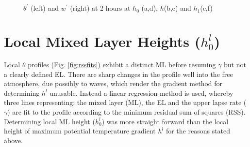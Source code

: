 \begin{figure}[htbp]
\caption{$\theta^{'}$ (left) and $w^{'}$ (right) at 2 hours at $h_{0}$ (a,d), $h$(b,e) and $h_{1}$(c,f)}
\begin{minipage}[b]{0.5\linewidth} 
        
        \\
        \\ 
 \end{minipage}             
\quad
\begin{minipage}[b]{0.5\linewidth}
        \\
       
       \\
        
\end{minipage}
        
        \label{fig:conts1}
\end{figure}

\clearpage


\section{Local Mixed Layer Heights ($h_{0}^{l}$)}
\label{sec:locmlh}     
\FloatBarrier

Local $\theta$ profiles (Fig. \ref{fig:rssfits}) exhibit a distinct \acs{ML} before resuming $\gamma$ but not 
a clearly defined \acs{EL}. There are sharp changes in the profile well into the free atmosphere, due possibly to 
waves, which render the gradient method for determining $h^{l}$ unusable.  Instead a linear regression method is used, 
whereby three lines representing: the mixed layer (ML), the EL and the upper lapse rate ($\gamma$) are fit to the 
profile according to the minimum residual sum of squares (RSS).  Determining local \acs{ML} height ($h_{0}^{l}$) was 
more straight forward than the local height of maximum potential temperature gradient $h^{l}$ for the reasons stated 
above.\\  

